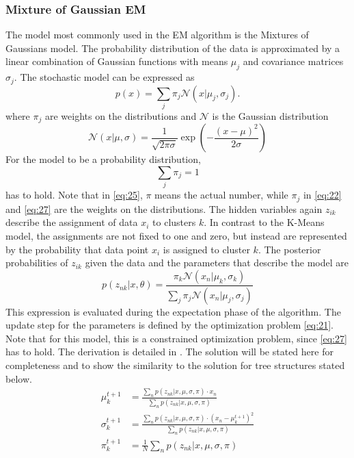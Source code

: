 \subsubsection{Mixture of Gaussian EM}
\label{sec:mixture-gaussian-em}
The model most commonly used in the EM algorithm is the Mixtures of Gaussians model.
The probability distribution of the data is approximated by a linear combination of Gaussian functions with means $\mu_j$ and covariance matrices $\sigma_j$.
The stochastic model can be expressed as
\begin{equation}
  \label{eq:22}
  p(x) = \sum_{j}\pi_j\mathcal{N}(x|\mu_j,\sigma_j).
\end{equation}
where $\pi_j$ are weights on the distributions and $\mathcal{N}$ is the Gaussian distribution
\begin{equation}
  \label{eq:25}
  \mathcal{N}(x|\mu,\sigma) = \frac{1}{\sqrt{2\pi\sigma}}\exp\left(-\frac{(x-\mu)^2}{2\sigma}\right)
\end{equation}
For the model to be a probability distribution,
\begin{equation}
  \label{eq:27}
  \sum_j\pi_j = 1
\end{equation}
has to hold.
Note that in \eqref{eq:25}, $\pi$ means the actual number, while $\pi_j$ in \eqref{eq:22} and \eqref{eq:27} are the weights on the distributions.
The hidden variables again $z_{ik}$ describe the  assignment of data $x_i$ to clusters $k$.
In contrast to the K-Means model, the assignments are not fixed to one and zero, but instead are represented by the probability that data point $x_i$ is assigned to cluster $k$.
The posterior probabilities of $z_{ik}$ given the data and the parameters that describe the model are
\begin{equation}
  \label{eq:26}
  p(z_{nk}|x, \theta) = \frac{\pi_k\mathcal{N}(x_n|\mu_k,\sigma_k)}{\sum_j\pi_j\mathcal{N}(x_n|\mu_j, \sigma_j)}
\end{equation}
This expression is evaluated during the expectation phase of the algorithm.
The update step for the parameters is defined by the optimization problem \eqref{eq:21}.
Note that for this model, this is a constrained optimization problem, since \eqref{eq:27} has to hold.
The derivation is detailed in .
The solution will be stated here for completeness and to show the similarity to the solution for tree structures stated below.
\begin{align}
  \label{eq:29}
  \mu_k^{t+1} &= \frac{\sum_np(z_{nk}|x, \mu, \sigma, \pi)\cdot x_n}{\sum_np(z_{nk}|x, \mu, \sigma, \pi)}\\
  \sigma_k^{t+1}&= \frac{\sum_np(z_{nk}|x, \mu, \sigma, \pi)\cdot (x_n-\mu_k^{t+1})^2}{\sum_np(z_{nk}|x, \mu, \sigma, \pi)}\\
  \pi_k^{t+1}&= \frac{1}{N}\sum_{n}p(z_{nk}|x, \mu, \sigma, \pi)
\end{align}

